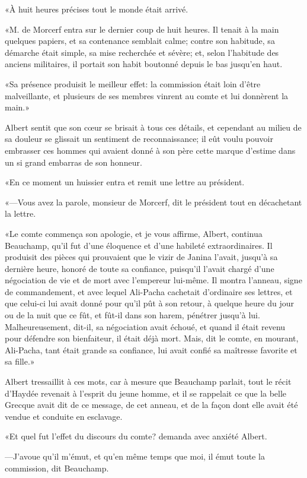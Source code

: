 «À huit heures précises tout le monde était arrivé. 

«M. de Morcerf entra sur le dernier coup de huit heures. Il tenait à la main quelques papiers, et sa contenance semblait calme; contre son habitude, sa démarche était simple, sa mise recherchée et sévère; et, selon l'habitude des anciens militaires, il portait son habit boutonné depuis le bas jusqu'en haut. 

«Sa présence produisit le meilleur effet: la commission était loin d'être malveillante, et plusieurs de ses membres vinrent au comte et lui donnèrent la main.» 

Albert sentit que son cœur se brisait à tous ces détails, et cependant au milieu de sa douleur se glissait un sentiment de reconnaissance; il eût voulu pouvoir embrasser ces hommes qui avaient donné à son père cette marque d'estime dans un si grand embarras de son honneur. 

«En ce moment un huissier entra et remit une lettre au président. 

«—Vous avez la parole, monsieur de Morcerf, dit le président tout en décachetant la lettre. 

«Le comte commença son apologie, et je vous affirme, Albert, continua Beauchamp, qu'il fut d'une éloquence et d'une habileté extraordinaires. Il produisit des pièces qui prouvaient que le vizir de Janina l'avait, jusqu'à sa dernière heure, honoré de toute sa confiance, puisqu'il l'avait chargé d'une négociation de vie et de mort avec l'empereur lui-même. Il montra l'anneau, signe de commandement, et avec lequel Ali-Pacha cachetait d'ordinaire ses lettres, et que celui-ci lui avait donné pour qu'il pût à son retour, à quelque heure du jour ou de la nuit que ce fût, et fût-il dans son harem, pénétrer jusqu'à lui. Malheureusement, dit-il, sa négociation avait échoué, et quand il était revenu pour défendre son bienfaiteur, il était déjà mort. Mais, dit le comte, en mourant, Ali-Pacha, tant était grande sa confiance, lui avait confié sa maîtresse favorite et sa fille.» 

Albert tressaillit à ces mots, car à mesure que Beauchamp parlait, tout le récit d'Haydée revenait à l'esprit du jeune homme, et il se rappelait ce que la belle Grecque avait dit de ce message, de cet anneau, et de la façon dont elle avait été vendue et conduite en esclavage. 

«Et quel fut l'effet du discours du comte? demanda avec anxiété Albert. 

—J'avoue qu'il m'émut, et qu'en même temps que moi, il émut toute la commission, dit Beauchamp. 

